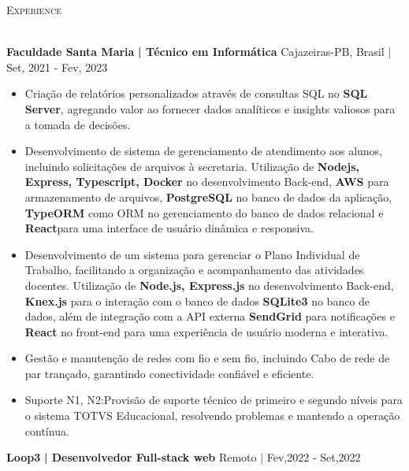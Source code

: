 \documentclass[a4paper]{article}
\newcommand{\lineunder} {
    \vspace*{-8pt} \\
    \hspace*{-18pt} \hrulefill \\
}
\newcommand{\header} [1] {
    {\hspace*{-18pt}\vspace*{6pt} \textsc{#1}}
    \vspace*{-6pt} \lineunder
}
\begin{document}
%
%
\header{Experience}
\vspace{2mm}

\textbf{Faculdade Santa Maria}\textbf{ | Técnico em Informática} \hfill Cajazeiras-PB, Brasil | Set, 2021 - Fev, 2023\\
\vspace{-3mm}
\begin{itemize} \itemsep -3pt
    \item  Criação de relatórios personalizados através de consultas SQL no \textbf{SQL Server}, agregando valor ao fornecer dados analíticos e insights valiosos para a tomada de decisões.
    \item  Desenvolvimento de sistema de gerenciamento de atendimento aos alunos, incluindo solicitações de arquivos à secretaria. Utilização de \textbf{Nodejs, Express, Typescript, Docker} no desenvolvimento Back-end,
          \textbf{AWS} para armazenamento de arquivos, \textbf{PostgreSQL} no banco de dados da aplicação, \textbf{TypeORM} como ORM no gerenciamento do banco de dados relacional e \textbf{React}para uma interface de usuário dinâmica e responsiva.
    \item  Desenvolvimento de um sistema para gerenciar o Plano Individual de Trabalho, facilitando a organização e acompanhamento das atividades docentes. Utilização de \textbf{Node.js, Express.js} no desenvolvimento Back-end,
          \textbf{Knex.js} para o interação com o banco de dados \textbf{SQLite3} no banco de dados, além de integração com a API externa \textbf{SendGrid} para notificações e \textbf{React} no front-end para uma experiência
          de usuário moderna e interativa.
    \item  Gestão e manutenção de redes com fio e sem fio, incluindo Cabo de rede de par trançado, garantindo conectividade confiável e eficiente.
    \item  Suporte N1, N2:Provisão de suporte técnico de primeiro e segundo níveis para o sistema TOTVS Educacional, resolvendo problemas e mantendo a operação contínua.
\end{itemize}
\textbf{Loop3}\textbf{ | Desenvolvedor Full-stack web} \hfill Remoto | Fev,2022 - Set,2022\\
\vspace{-3mm}
\end{document}
